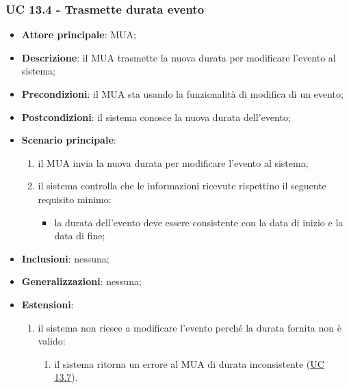     \subsubsection{UC 13.4 - Trasmette durata evento} \label{sec:UC13.4}
    \begin{itemize}
        \item \textbf{Attore principale}: MUA;
        \item \textbf{Descrizione}: il MUA trasmette la nuova durata per modificare l'evento al sistema;
        \item \textbf{Precondizioni}: il MUA sta usando la funzionalità di modifica di un evento;
        \item \textbf{Postcondizioni}: il sistema conosce la nuova durata dell'evento;
        \item \textbf{Scenario principale}:
            \begin{enumerate}
                \item il MUA invia la nuova durata per modificare l'evento al sistema;
                \item il sistema controlla che le informazioni ricevute rispettino il seguente requisito minimo:
                    \begin{itemize}
                        \item la durata dell'evento deve essere consistente con la data di inizio e la data di fine;
                    \end{itemize}
            \end{enumerate}
        \item \textbf{Inclusioni}: nessuna;
        \item \textbf{Generalizzazioni}: nessuna;
        \item \textbf{Estensioni}:
            \begin{enumerate}[label=\alph*.]
                \item il sistema non riesce a modificare l'evento perché la durata fornita non è valido:
                \begin{enumerate}[label=\arabic*.]
                    \item il sistema ritorna un errore al MUA di durata inconsistente (\hyperref[sec:UC13.7]{UC 13.7}).
                \end{enumerate}
            \end{enumerate}
    \end{itemize}


